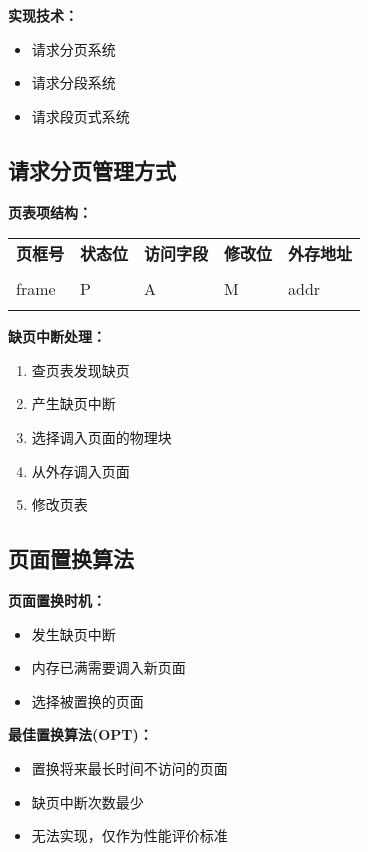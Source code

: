 \documentclass[lang=cn,newtx,10pt,scheme=chinese]{../../elegantbook}
\begin{document}
\textbf{实现技术：}
\begin{itemize}
  \item 请求分页系统
  \item 请求分段系统
  \item 请求段页式系统
\end{itemize}

\subsection{请求分页管理方式}

\textbf{页表项结构：}
\begin{longtable}{@{}p{2cm}p{2cm}p{2cm}p{2cm}p{2cm}@{}}
\toprule
\textbf{页框号} & \textbf{状态位} & \textbf{访问字段} & \textbf{修改位} & \textbf{外存地址} \\\\ \midrule
\endhead

frame & P & A & M & addr \\\\

\bottomrule
\end{longtable}

\textbf{缺页中断处理：}
\begin{enumerate}
  \item 查页表发现缺页
  \item 产生缺页中断
  \item 选择调入页面的物理块
  \item 从外存调入页面
  \item 修改页表
\end{enumerate}
\subsection{页面置换算法}

\textbf{页面置换时机：}
\begin{itemize}
  \item 发生缺页中断
  \item 内存已满需要调入新页面
  \item 选择被置换的页面
\end{itemize}

\textbf{最佳置换算法(OPT)：}
\begin{itemize}
  \item 置换将来最长时间不访问的页面
  \item 缺页中断次数最少
  \item 无法实现，仅作为性能评价标准
\end{itemize}
\end{document}
